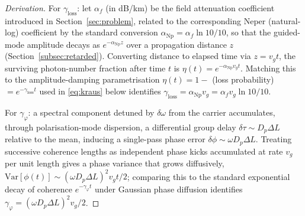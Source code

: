 \documentclass[journal,twocolumn]{IEEEtran}
\theoremstyle{definition}
\theoremstyle{plain}
\newcommand{\alphaf}{\alpha_{f}}
\begin{document}
\begin{proof}[Derivation]
For $\gamma_{\mathrm{loss}}$: let $\alphaf$ (in dB/km) be the field
attenuation coefficient introduced in Section~\ref{sec:problem},
related to the corresponding Neper (natural-log) coefficient by the
standard conversion $\alpha_{\mathrm{Np}} = \alphaf \ln10/10$, so
that the guided-mode amplitude decays as $e^{-\alpha_{\mathrm{Np}}z}$
over a propagation distance $z$ (Section~\ref{subsec:retarded}).
Converting distance to elapsed time via $z = v_g t$, the surviving
photon-number fraction after time $t$ is
$\eta(t) = e^{-\alpha_{\mathrm{Np}} v_g t}$.  Matching this to the
amplitude-damping parametrisation $\eta(t) = 1 - $ (loss
probability) $= e^{-\gamma_{\mathrm{loss}} t}$ used in
\eqref{eq:kraus} below identifies $\gamma_{\mathrm{loss}} =
\alpha_{\mathrm{Np}} v_g = \alphaf v_g \ln10/10$.

For $\gamma_\varphi$: a spectral component detuned by $\delta\omega$
from the carrier accumulates, through polarisation-mode dispersion,
a differential group delay $\delta\tau \sim D_p\Delta L$ relative to
the mean, inducing a single-pass phase error $\delta\phi \sim \omega
D_p \Delta L$. Treating successive coherence lengths as independent
phase kicks accumulated at rate $v_g$ per unit length gives a
phase variance that grows diffusively, $\mathrm{Var}[\phi(t)]
\sim (\omega D_p\Delta L)^2 v_g t/2$; comparing this to the standard
exponential decay of coherence $e^{-\gamma_\varphi t}$ under Gaussian
phase diffusion identifies $\gamma_\varphi = (\omega D_p\Delta L)^2
v_g/2$.
\end{proof}
\end{document}
